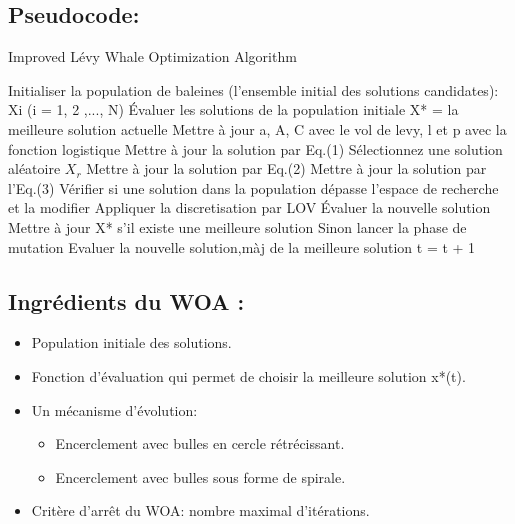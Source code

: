 \documentclass[12pt]{article}
\begin{document}
\subsection{Pseudocode:}
\begin{algorithm}[H]
    \caption{Improved Lévy Whale Optimization Algorithm}
    \begin{algorithmic}
        \STATE Initialiser la population de baleines (l'ensemble initial des solutions candidates): Xi (i = 1, 2 ,..., N)\;
        \STATE Évaluer les solutions de la population initiale\;
        \STATE X* = la meilleure solution actuelle\;
                \STATE Mettre à jour a, A, C avec le vol de levy, l et p avec la fonction logistique\;
                        \STATE Mettre à jour la solution par Eq.(1)\;
                    \ELSE
                        \STATE Sélectionnez une solution aléatoire \(X_r\)\;
                        \STATE Mettre à jour la solution par Eq.(2)\;
                    \ENDIF
                \ELSE 
                    \STATE Mettre à jour la solution par l'Eq.(3)\;
                \ENDIF
            \ENDFOR
            \STATE Vérifier si une solution dans la population dépasse l'espace de recherche et la modifier\;
            \STATE Appliquer la discretisation par LOV\;
            \STATE Évaluer la nouvelle solution\;
            \STATE Mettre à jour X* s'il existe une meilleure solution Sinon lancer la phase de mutation\;
            \STATE Evaluer la nouvelle solution,màj de la meilleure solution
            \STATE t = t + 1\;
        \ENDWHILE
    \end{algorithmic}
\end{algorithm}
\subsection{Ingrédients du WOA :}
\begin{itemize}
    \item Population initiale des solutions.
    \item Fonction d’évaluation qui permet de choisir la meilleure solution x*(t).
    \item Un mécanisme d'évolution:
    \begin{itemize}
        \item Encerclement avec bulles en cercle rétrécissant.
        \item Encerclement avec bulles sous forme de spirale.
    \end{itemize}
    \item Critère d'arrêt du WOA: nombre maximal d’itérations.    
\end{itemize}
\end{document}
